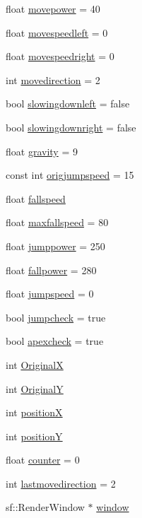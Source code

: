 \begin{DoxyCompactItemize}
\item 
float \hyperlink{classAI_a9cf2ba2f23c71833d6337b9e486cb6a3}{movepower} = 40
\item 
float \hyperlink{classAI_aa4053f5803c847fc13db08bc8cd6737b}{movespeedleft} = 0
\item 
float \hyperlink{classAI_a5b9ee08216e80b40ef278c0b8e71bdf2}{movespeedright} = 0
\item 
int \hyperlink{classAI_ac23347ccaa9f699521417509ab73e271}{movedirection} = 2
\item 
bool \hyperlink{classAI_a33b48858d468564363727d20164f2c54}{slowingdownleft} = false
\item 
bool \hyperlink{classAI_a4ae562cbe6afd5d010d5329c0c926459}{slowingdownright} = false
\item 
float \hyperlink{classAI_af653a36c44ed6b2d781f09027df55ab7}{gravity} = 9
\item 
const int \hyperlink{classAI_ac7bc723979294e5fe5d7438713229473}{origjumpspeed} = 15
\item 
float \hyperlink{classAI_a8aff5a3b49415dcb533f0a570290bd86}{fallspeed}
\item 
float \hyperlink{classAI_ade9dbd955f4aea8feab5bbff996c3a48}{maxfallspeed} = 80
\item 
float \hyperlink{classAI_a79f9ea14d535b646e35ab8f2d95f59da}{jumppower} = 250
\item 
float \hyperlink{classAI_ab6d693d4a0669758d7bcc48d43d348b7}{fallpower} = 280
\item 
float \hyperlink{classAI_a9bcfb85a19a10d064a1db2772be9e30d}{jumpspeed} = 0
\item 
bool \hyperlink{classAI_aefe27541a9d4aaa10d23b421de4b2405}{jumpcheck} = true
\item 
bool \hyperlink{classAI_a4f56968f26a5263911c83062945aaec7}{apexcheck} = true
\item 
int \hyperlink{classAI_a3399d587364d2fef3e4a176ecdc294cc}{OriginalX}
\item 
int \hyperlink{classAI_a652d91a3a0b53d7919f6a2b02e301f26}{OriginalY}
\item 
int \hyperlink{classAI_a123529be0b9d2c660accf40ae93bc007}{positionX}
\item 
int \hyperlink{classAI_a558d3803098870a349f6f37c2f29a22d}{positionY}
\item 
float \hyperlink{classAI_af56d250c7efc5f36915193949d87be21}{counter} = 0
\item 
int \hyperlink{classAI_ad23ffbd48fb9fd95ec18df649810b766}{lastmovedirection} = 2
\item 
sf\+::\+Render\+Window $\ast$ \hyperlink{classAI_a0484a23ffd7e5c09b7fc252350a2c8c4}{window}
\end{DoxyCompactItemize}


